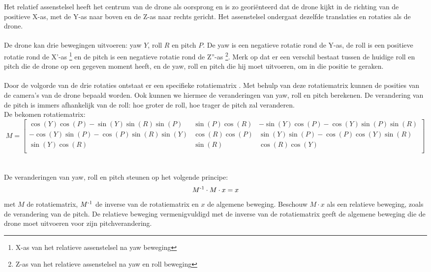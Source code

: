 \noindent
Het relatief assenstelsel heeft het centrum van de drone als oorsprong en is zo georiënteerd dat de drone kijkt in de richting van de positieve X-as, met de Y-as naar boven en de Z-as naar rechts gericht. Het assenstelsel ondergaat dezelfde translaties en rotaties als de drone.
\\
\\
De drone kan drie bewegingen uitvoeren: yaw \(Y\), roll \(R\) en pitch \(P\). De yaw is een negatieve rotatie rond de Y-as, de roll is een positieve rotatie rond de X'-as \footnote{X-as van  het relatieve assenstelsel na yaw beweging} en de pitch is een negatieve rotatie rond de Z''-as \footnote{Z-as van het relatieve assenstelsel na yaw en roll beweging}. Merk op dat er een verschil bestaat tussen de huidige roll en pitch die de drone op een gegeven moment heeft, en de yaw, roll en pitch die hij moet uitvoeren, om in die positie te geraken.
\\
\\
Door de volgorde van de drie rotaties ontstaat er een specifieke rotatiematrix \cite{website:assenstelsel}. Met behulp van deze rotatiematrix kunnen de posities van de camera's van de drone bepaald worden. Ook kunnen we hiermee de veranderingen van yaw, roll en pitch berekenen. De verandering van de pitch is immers afhankelijk van de roll: hoe groter de roll, hoe trager de pitch zal veranderen.
\\
De bekomen rotatiematrix: 
\begin{equation*}
M = 
\begin{bmatrix}
\cos(Y)\cos(P) -\sin(Y)\sin(R)\sin(P) & \sin(P)\cos(R) & -\sin(Y)\cos(P) - \cos(Y)\sin(P)\sin(R)\\
-\cos(Y)\sin(P) - \cos(P)\sin(R)\sin(Y) & \cos(R)\cos(P) & \sin(Y)\sin(P) - \cos(P)\cos(Y)\sin(R) \\ 
\sin(Y)\cos(R) & \sin(R) & \cos(R)\cos(Y)\\
\end{bmatrix} \label{rotatiematrix}
\end{equation*}
\\
\\
De veranderingen van yaw, roll en pitch steunen op het volgende principe:
\begin{equation*}
M\textsuperscript{-1} \cdot M \cdot x = x \label{rotatieBewegingVergelijking}
\end{equation*}
met \(M\) de rotatiematrix, \(M\textsuperscript{-1}\) de inverse van de rotatiematrix en \(x\) de algemene beweging. Beschouw \(M \cdot x\) als een relatieve beweging, zoals de verandering van de pitch. De relatieve beweging vermenigvuldigd met de inverse van de rotatiematrix geeft de algemene beweging die de drone moet uitvoeren voor zijn pitchverandering.